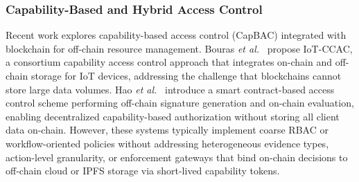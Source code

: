 \documentclass[pdflatex,sn-mathphys-num]{sn-jnl}
\begin{document}
\subsubsection{Capability-Based and Hybrid Access Control}
Recent work explores capability-based access control (CapBAC) integrated with blockchain for off-chain resource management. Bouras \emph{et al.}~\cite{bouras2021iotccac} propose IoT-CCAC, a consortium capability access control approach that integrates on-chain and off-chain storage for IoT devices, addressing the challenge that blockchains cannot store large data volumes. Hao \emph{et al.}~\cite{hao2021smartcontract} introduce a smart contract-based access control scheme performing off-chain signature generation and on-chain evaluation, enabling decentralized capability-based authorization without storing all client data on-chain. However, these systems typically implement coarse RBAC or workflow-oriented policies without addressing heterogeneous evidence types, action-level granularity, or enforcement gateways that bind on-chain decisions to off-chain cloud or IPFS storage via short-lived capability tokens.
\end{document}
